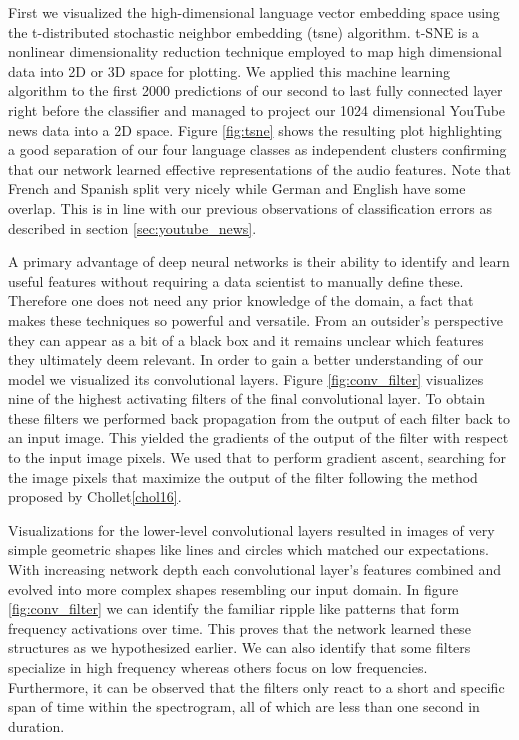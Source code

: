 First we visualized the high-dimensional language vector embedding space using the t-distributed stochastic neighbor embedding (\ac{tsne}) algorithm\cite{maaten2008visualizing}. t-SNE is a nonlinear dimensionality reduction technique employed to map high dimensional data into 2D or 3D space for plotting. We applied this machine learning algorithm to the first 2000 predictions of our second to last fully connected layer right before the classifier and managed to project our 1024 dimensional YouTube news data into a 2D space. Figure \ref{fig:tsne} shows the resulting plot highlighting a good separation of our four language classes as independent clusters confirming that our network learned effective representations of the audio features. Note that French and Spanish split very nicely while German and English have some overlap. This is in line with our previous observations of classification errors as described in section \ref{sec:youtube_news}.

A primary advantage of deep neural networks is their ability to identify and learn useful features without requiring a data scientist to manually define these. Therefore one does not need any prior knowledge of the domain, a fact that makes these techniques so powerful and versatile. From an outsider's perspective they can appear as a bit of a black box and it remains unclear which features they ultimately deem relevant. In order to gain a better understanding of our model we visualized its convolutional layers. Figure \ref{fig:conv_filter} visualizes nine of the highest activating filters of the final convolutional layer. To obtain these filters we performed back propagation from the output of each filter back to an input image. This yielded the gradients of the output of the filter with respect to the input image pixels. We used that to perform gradient ascent, searching for the image pixels that maximize the output of the filter following the method proposed by Chollet\ref{chol16}.

Visualizations for the lower-level convolutional layers resulted in images of very simple geometric shapes like lines and circles which matched our expectations. With increasing network depth each convolutional layer's features combined and evolved into more complex shapes resembling our input domain. In figure \ref{fig:conv_filter} we can identify the familiar ripple like patterns that form frequency activations over time. This proves that the network learned these structures as we hypothesized earlier. We can also identify that some filters specialize in high frequency whereas others focus on low frequencies. Furthermore, it can be observed that the filters only react to a short and specific span of time within the spectrogram, all of which are less than one second in duration.

